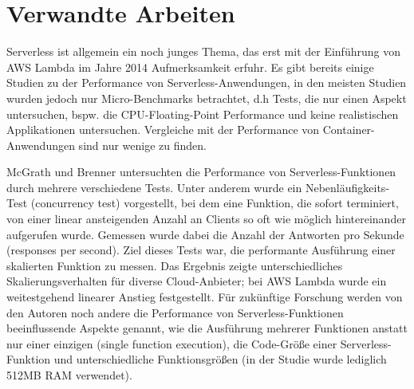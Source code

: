 \section{Verwandte Arbeiten}
Serverless ist allgemein ein noch junges Thema, das erst mit der Einführung von \ac{AWS} Lambda im Jahre 2014 Aufmerksamkeit erfuhr\cite{ken_owens_cncf_2018}. Es gibt bereits einige Studien zu der Performance von Serverless-Anwendungen, in den meisten Studien wurden jedoch nur Micro-Benchmarks betrachtet, d.h Tests, die nur einen Aspekt untersuchen, bspw. die CPU-Floating-Point Performance und keine realistischen Applikationen untersuchen\cite{scheuner_function-as--service_2020}. Vergleiche mit der Performance von Container-Anwendungen sind nur wenige zu finden.  

McGrath und Brenner untersuchten die Performance von Serverless-\linebreak Funktionen durch mehrere verschiedene Tests\cite{mcgrath_serverless_2017}. Unter anderem wurde ein Nebenläufigkeits-Test (concurrency test) vorgestellt, bei dem eine Funktion, die sofort terminiert, von einer linear ansteigenden Anzahl an Clients so oft wie möglich hintereinander aufgerufen wurde. Gemessen wurde dabei die Anzahl der Antworten pro Sekunde (responses per second). Ziel dieses Tests war, die performante Ausführung einer skalierten Funktion zu messen. Das Ergebnis zeigte unterschiedliches Skalierungsverhalten für diverse Cloud-Anbieter; bei \ac{AWS} Lambda wurde ein weitestgehend linearer Anstieg festgestellt. 
Für zukünftige Forschung werden von den Autoren noch andere die Performance von Serverless-Funktionen beeinflussende Aspekte genannt, wie die Ausführung mehrerer Funktionen anstatt nur einer einzigen (single function execution), die Code-Größe einer Serverless-Funktion und unterschiedliche Funktionsgrößen (in der Studie wurde lediglich 512MB RAM verwendet).

